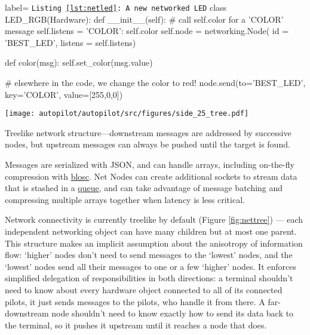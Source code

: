 \begin{listing}[H]
\begin{pythoncode*}{label= \texttt{Listing \ref{lst:netled}: A new networked LED}}
class LED_RGB(Hardware):
    def __init__(self):
        # call self.color for a 'COLOR' message
        self.listens = {'COLOR': self.color}
        self.node = networking.Node(
            id      = 'BEST_LED',
            listens = self.listens)
        
    def color(msg):
        self.set_color(msg.value)
        
# elsewhere in the code, we change the color to red!
node.send(to='BEST_LED', key='COLOR', value=[255,0,0])
\end{pythoncode*}
\captionlistentry{}
\label{lst:netled}
\end{listing}
\begin{marginfigure}[0cm]
\texttt{[image: autopilot/autopilot/src/figures/side\_25\_tree.pdf]}
\caption{Treelike network structure---downstream messages are addressed by successive nodes, but upstream messages can always be pushed until the target is found.}
\label{fig:nettree}
\end{marginfigure}

Messages are serialized with JSON, and can handle arrays, including on-the-fly compression with \href{https://www.blosc.org/}{blosc}. Net Nodes can create additional sockets to stream data that is stashed in a \href{https://docs.python.org/3/library/queue.html\#queue.Queue}{queue}, and can take advantage of message batching and compressing multiple arrays together when latency is less critical.

Network connectivity is currently treelike by default (Figure \ref{fig:nettree}) --- each independent networking object can have many children but at most one parent. This structure makes an implicit assumption about the anisotropy of information flow: `higher' nodes don't need to send messages to the `lowest' nodes, and the `lowest' nodes send all their messages to one or a few `higher' nodes. It enforces simplified delegation of responsibilities in both directions: a terminal shouldn't need to know about every hardware object connected to all of its connected pilots, it just sends messages to the pilots, who handle it from there. A far-downstream node shouldn't need to know exactly how to send its data back to the terminal, so it pushes it upstream until it reaches a node that does.

